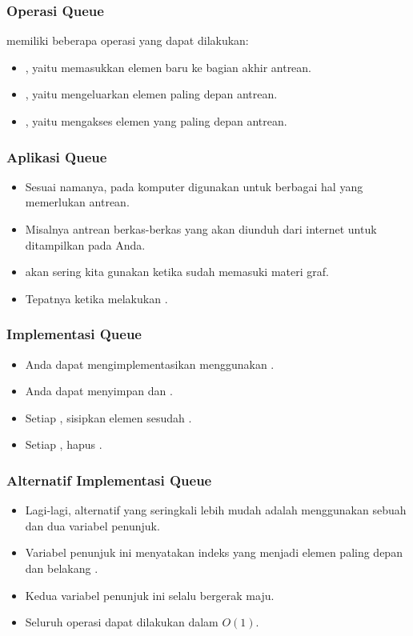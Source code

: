 \begin{frame}
\frametitle{Operasi Queue}

 memiliki beberapa operasi yang dapat dilakukan:
\begin{itemize}
  \item {}, yaitu memasukkan elemen baru ke bagian akhir antrean.
  \item {}, yaitu mengeluarkan elemen paling depan antrean.
  \item {}, yaitu mengakses elemen yang paling depan antrean.
\end{itemize}
\end{frame}

\begin{frame}
\frametitle{Aplikasi Queue}
\begin{itemize}
  \item Sesuai namanya, pada komputer  digunakan untuk berbagai hal yang memerlukan antrean.
  \item Misalnya antrean berkas-berkas yang akan diunduh dari internet untuk ditampilkan pada  Anda.
  \item {} akan sering kita gunakan ketika sudah memasuki materi graf.
  \item Tepatnya ketika melakukan .
\end{itemize}
\end{frame}

\begin{frame}
\frametitle{Implementasi Queue}
\begin{itemize}
  \item Anda dapat mengimplementasikan  menggunakan .
  \item Anda dapat menyimpan   dan .
  \item Setiap , sisipkan elemen sesudah .
  \item Setiap , hapus  .
\end{itemize}
\end{frame}

\begin{frame}
\frametitle{Alternatif Implementasi Queue}
\begin{itemize}
  \item Lagi-lagi, alternatif yang seringkali lebih mudah adalah menggunakan sebuah  dan dua variabel penunjuk.
  \item Variabel penunjuk ini menyatakan indeks  yang menjadi elemen paling depan dan belakang .
  \item Kedua variabel penunjuk ini selalu bergerak maju.
  \item Seluruh operasi dapat dilakukan dalam $O(1)$.
\end{itemize}
\end{frame}

